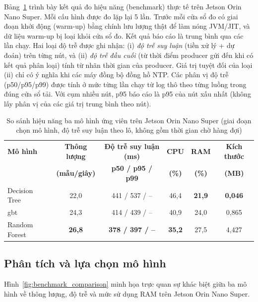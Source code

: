Bảng~\ref{tab:edge_benchmark} trình bày kết quả đo hiệu năng (benchmark) thực tế trên Jetson Orin Nano Super. Mỗi cấu hình được đo lặp lại 5 lần. Trước mỗi cửa sổ đo có giai đoạn khởi động (warm-up) bằng chính lưu lượng thật để làm nóng JVM/JIT, và dữ liệu warm-up bị loại khỏi cửa sổ đo. Kết quả báo cáo là trung bình qua các lần chạy. Hai loại độ trễ được ghi nhận: (i) \emph{độ trễ suy luận} (tiền xử lý + dự đoán) trên từng nút, và (ii) \emph{độ trễ đầu cuối} (từ thời điểm producer gửi đến khi có kết quả phân loại) tính từ nhãn thời gian của producer. Giá trị tuyệt đối của loại (ii) chỉ có ý nghĩa khi các máy đồng bộ đồng hồ NTP. Các phân vị độ trễ (p50/p95/p99) được tính ở mức từng lần chạy từ log thô theo từng luồng trong đúng cửa sổ tải. Với cụm nhiều nút, p95 báo cáo là p95 của nút xấu nhất (không lấy phân vị của các giá trị trung bình theo nút).

\begin{table}[htbp]
\centering
\caption[So sánh hiệu năng ba mô hình ứng viên trên Jetson Orin Nano Super]{So sánh hiệu năng ba mô hình ứng viên trên Jetson Orin Nano Super (giai đoạn chọn mô hình, độ trễ suy luận theo lô, không gồm thời gian chờ hàng đợi)}
\label{tab:edge_benchmark}
\small
\begin{tabular*}{\textwidth}{@{\extracolsep{\fill}}lccccc@{}}
\toprule
\textbf{Mô hình} & \textbf{Thông lượng} & \textbf{Độ trễ suy luận (ms)} & \textbf{CPU} & \textbf{RAM} & \textbf{Kích thước} \\
                  & \textbf{(mẫu/giây)} & \textbf{p50 / p95 / p99} & \textbf{(\%)} & \textbf{(\%)} & \textbf{(MB)} \\ \midrule
Decision Tree     & 22{,}0 & 441 / 537 / -- & 46{,}4 & \textbf{21{,}9} & \textbf{0{,}046} \\
\ac{gbt}               & 24{,}3 & 414 / 439 / -- & 40{,}9 & 24{,}0 & 0{,}865 \\
Random Forest     & \textbf{26{,}8} & \textbf{378 / 397 / --} & \textbf{35{,}2} & 27{,}5 & 4{,}427 \\
\bottomrule
\end{tabular*}
\end{table}

\subsection{Phân tích và lựa chọn mô hình}

Hình~\ref{fig:benchmark_comparison} minh họa trực quan sự khác biệt giữa ba mô hình về thông lượng, độ trễ và mức sử dụng RAM trên Jetson Orin Nano Super.

